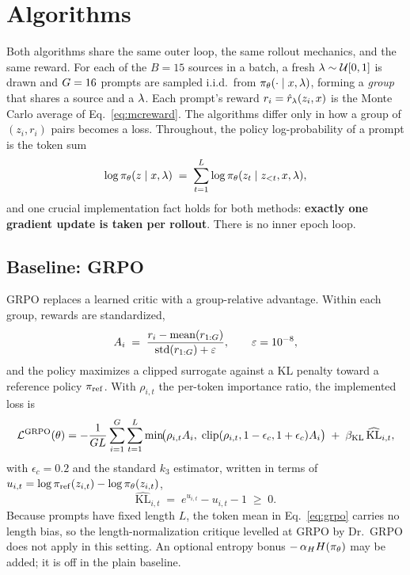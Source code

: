 \section{Algorithms}
\label{sec:algos}

Both algorithms share the same outer loop, the same rollout mechanics, and the
same reward. For each of the $B=15$ sources in a batch, a fresh
$\lambda \sim \mathcal{U}[0,1]$ is drawn and $G = 16$ prompts are sampled
i.i.d.\ from $\pi_\theta(\cdot \mid x, \lambda)$, forming a \emph{group} that shares a
source and a $\lambda$. Each prompt's reward $r_i = \hat{r}_{\lambda}(z_i, x)$ is the
Monte Carlo average of Eq.~\eqref{eq:mcreward}. The algorithms differ only in
how a group of $(z_i, r_i)$ pairs becomes a loss. Throughout, the policy
log-probability of a prompt is the token sum
\begin{equation}
  \log \pi_\theta(z \mid x, \lambda) \;=\; \sum_{t=1}^{L} \log \pi_\theta(z_t \mid z_{<t}, x, \lambda),
\end{equation}
and one crucial implementation fact holds for both methods: \textbf{exactly one
gradient update is taken per rollout}. There is no inner epoch loop.

\subsection{Baseline: GRPO}
\label{sec:grpo}

GRPO replaces a learned critic with a group-relative advantage. Within each
group, rewards are standardized,
\begin{equation}
  A_i \;=\; \frac{r_i - \mathrm{mean}(r_{1:G})}
                 {\mathrm{std}(r_{1:G}) + \varepsilon},
  \qquad \varepsilon = 10^{-8},
  \label{eq:grpo-adv}
\end{equation}
and the policy maximizes a clipped surrogate against a KL penalty toward a
reference policy $\pi_{\mathrm{ref}}$. With $\rho_{i,t}$ the per-token importance ratio,
the implemented loss is
\begin{equation}
  \mathcal{L}^{\mathrm{GRPO}}(\theta)
  = -\frac{1}{G L}\sum_{i=1}^{G}\sum_{t=1}^{L}
      \min\!\bigl(\rho_{i,t} A_i,\;
        \mathrm{clip}(\rho_{i,t}, 1-\epsilon_c, 1+\epsilon_c) A_i \bigr)
    \;+\; \beta_{\mathrm{KL}}\, \widehat{\mathrm{KL}}_{i,t},
  \label{eq:grpo}
\end{equation}
with $\epsilon_c = 0.2$ and the standard $k_3$ estimator, written in terms of
$u_{i,t} = \log \pi_{\mathrm{ref}}(z_{i,t}) - \log \pi_\theta(z_{i,t})$,
\begin{equation}
  \widehat{\mathrm{KL}}_{i,t} \;=\; e^{u_{i,t}} - u_{i,t} - 1 \;\ge\; 0 .
  \label{eq:k3}
\end{equation}
Because prompts have fixed length $L$, the token mean in Eq.~\eqref{eq:grpo}
carries no length bias, so the length-normalization critique levelled at GRPO by
Dr.\ GRPO does not apply in this setting. An optional entropy bonus
$-\,\alpha_H H(\pi_\theta)$ may be added; it is off in the plain baseline.

